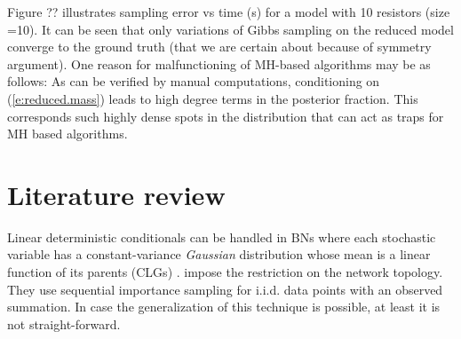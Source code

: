 \documentclass{article}
\begin{document}
Figure ?? illustrates sampling error vs time (s) for a model with 10 resistors (size =10).
It can be seen that only variations of Gibbs sampling on the reduced model converge to the ground truth (that we are certain about because of symmetry argument). 
One reason for malfunctioning of MH-based algorithms may be as follows:
As can be verified by manual computations, conditioning on 
(\ref{e:reduced.mass}) leads to high degree terms in the posterior fraction. This corresponds such highly dense spots in the distribution that can act as traps for MH based algorithms.

\section{Literature review}
\label{sect:literature.review}
Linear deterministic conditionals can  be handled in BNs
where each stochastic variable has a constant-variance \emph{Gaussian} distribution whose mean is a linear function of its parents (CLGs) \cite{lauritzen2001stable}.
\cite{li2013dynamic} impose the restriction on the network topology.
They use sequential importance sampling for i.i.d. data points with an observed summation.%
In case the generalization of this technique is possible, at least it is not straight-forward.
\end{document}
